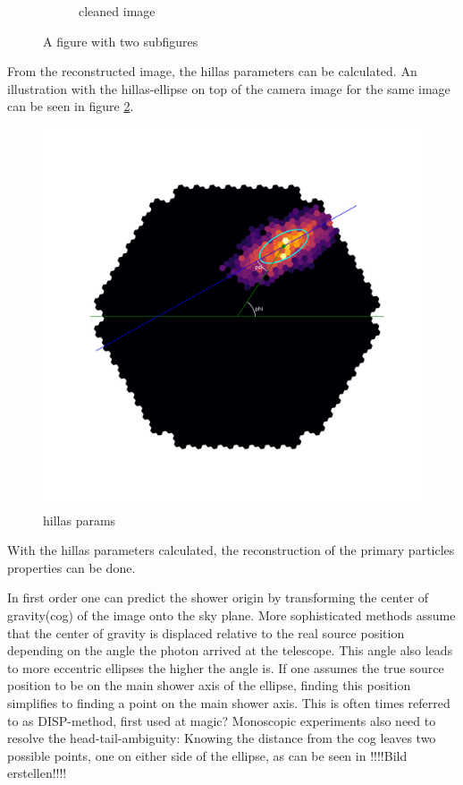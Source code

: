 \begin{figure}
\begin{subfigure}{.5\textwidth}
 		\caption{cleaned image}
	\end{subfigure}
	\caption{A figure with two subfigures}
	\label{fig:shower_cleaning}
\end{figure}

From the reconstructed image, the hillas parameters can be calculated.
An illustration with the hillas-ellipse on top of the camera image 
for the same image can be seen in figure \ref{fig:hillas_params}.

\begin{figure}
	\includegraphics[width=.8\textwidth]{Plots/hillas_cleaned_params.pdf}
	\caption{hillas params}
	\label{fig:hillas_params}
\end{figure}

With the hillas parameters calculated, the reconstruction of the 
primary particles properties can be done.

In first order one can predict the shower origin by 
transforming the center of gravity(cog) of the image onto the sky plane.
More sophisticated methods assume that the 
center of gravity is displaced relative to the
real source position depending on the angle the photon arrived at the telescope.
This angle also leads to more eccentric ellipses the higher the angle is.
If one assumes the true source position to be on the main shower axis of the ellipse,
finding this position simplifies to finding a point on the main shower axis.
This is often times referred to as DISP-method, first used at magic? \cite{someting magic idk}
Monoscopic experiments also need to resolve the head-tail-ambiguity:
Knowing the distance from the cog leaves two possible points, one on either side 
of the ellipse, as can be seen in !!!!Bild erstellen!!!!

